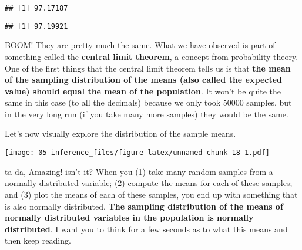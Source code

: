 \documentclass[
]{book}
\newenvironment{Shaded}{\begin{snugshade}}{\end{snugshade}}
\newcommand{\AttributeTok}[1]{\textcolor[rgb]{0.13,0.29,0.53}{#1}}
\newcommand{\CommentTok}[1]{\textcolor[rgb]{0.56,0.35,0.01}{\textit{#1}}}
\newcommand{\FunctionTok}[1]{\textcolor[rgb]{0.13,0.29,0.53}{\textbf{#1}}}
\newcommand{\NormalTok}[1]{#1}
\newcommand{\SpecialCharTok}[1]{\textcolor[rgb]{0.81,0.36,0.00}{\textbf{#1}}}
\newcommand{\StringTok}[1]{\textcolor[rgb]{0.31,0.60,0.02}{#1}}
\begin{document}
\begin{Shaded}
\end{Shaded}

\begin{verbatim}
## [1] 97.17187
\end{verbatim}

\begin{Shaded}
\end{Shaded}

\begin{verbatim}
## [1] 97.19921
\end{verbatim}

BOOM! They are pretty much the same. What we have observed is part of something called the \textbf{central limit theorem}, a concept from probability theory. One of the first things that the central limit theorem tells us is that \textbf{the mean of the sampling distribution of the means (also called the expected value) should equal the mean of the population}. It won't be quite the same in this case (to all the decimals) because we only took 50000 samples, but in the very long run (if you take many more samples) they would be the same.

Let's now visually explore the distribution of the sample means.

\begin{Shaded}
\end{Shaded}

\texttt{[image: 05-inference\_files/figure-latex/unnamed-chunk-18-1.pdf]}

ta-da, Amazing! isn't it? When you (1) take many random samples from a normally distributed variable; (2) compute the means for each of these samples; and (3) plot the means of each of these samples, you end up with something that is also normally distributed. \textbf{The sampling distribution of the means of normally distributed variables in the population is normally distributed}. I want you to think for a few seconds as to what this means and then keep reading.
\end{document}
